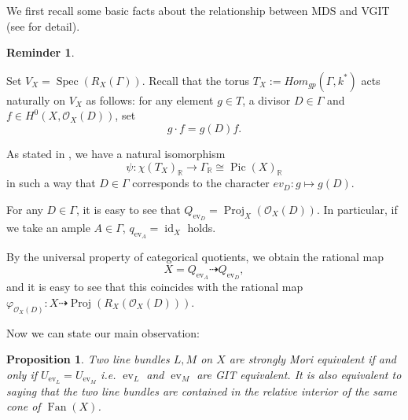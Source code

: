 \documentclass[12pt,twoside]{amsart}
\newtheorem{prop}[theo]{Proposition}
\theoremstyle{definition}
\newtheorem{reminder}[theo]{Reminder}
\newcommand\Pic{\mathop{\mathrm{Pic}}\nolimits}
\newcommand\Spec{\mathop{\mathrm{Spec}}\nolimits}
\newcommand\ev{\mathop{\mathrm{ev}}\nolimits}
\newcommand\Proj{\mathop{\mathrm{Proj}}}
\newcommand\Fan{\mathop{\mathrm{Fan}}}
\newcommand\id{\mathop{\mathrm{id}}}
\newcommand\br{\mathbb{R}}
\newcommand\OO{\mathcal{O}}
\begin{document}
We first recall some basic facts about the relationship between MDS and VGIT (see \cite{hk} for detail).
\begin{reminder}\label{reminder of GIT description}


Set $V_X=\Spec{(R_X(\Gamma))}$.
Recall that the torus $T_X:=Hom_{gp}(\Gamma, k^{*})$ acts naturally on $V_X$ as follows:
for any element $g\in T$, a divisor $D\in\Gamma$ and $f\in H^0(X,\OO_X{(D)})$,
set
\begin{equation*}
g\cdot f=g(D)f.
\end{equation*}

As stated in \cite[Theorem 2.3]{hk}, we have a natural isomorphism
\begin{equation*}
\psi: \chi{(T_X)}_{\br}\to\Gamma_{\br}\cong\Pic{(X)}_{\br}
\end{equation*}
in such a way that $D\in\Gamma$ corresponds to the character $ev_{D}:g\mapsto g(D)$.
 
For any $D\in\Gamma$, it is easy to see that $Q_{\ev_D}=\Proj_{X}(\OO_X(D))$.
In particular, if we take an ample $A\in\Gamma$, $q_{\ev_A}=\id_X$ holds.

By the universal property of categorical quotients, we obtain the rational map
\begin{equation*}
X=Q_{\ev_A}\dasharrow Q_{\ev_D},
\end{equation*}
and it is easy to see that this coincides with the rational map
$\varphi_{\OO_X(D)}:X\dasharrow\Proj{(R_X(\OO_X(D)))}$.
\end{reminder}


Now we can state our main observation:
\begin{prop}\label{strong Mori=GIT}
Two line bundles $L, M$ on $X$ are strongly Mori equivalent if and only if
$U_{\ev_{L}}=U_{\ev_{M}}$ i.e. $\ev_L$ and $\ev_M$ are GIT equivalent.
It is also equivalent to saying that the two line bundles are contained in
the relative interior of the same cone of $\Fan{(X)}$.
\end{prop}
\end{document}
